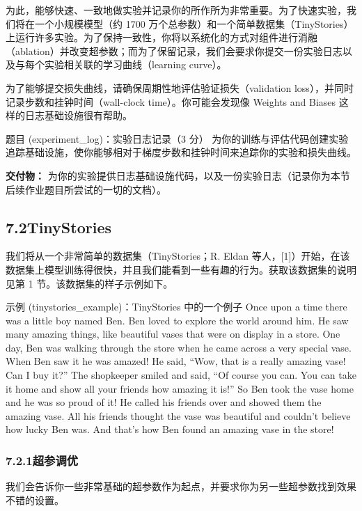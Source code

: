 为此，能够快速、一致地做实验并记录你的所作所为非常重要。为了快速实验，我们将在一个小规模模型（约 1700 万个总参数）和一个简单数据集（TinyStories）上运行许多实验。为了保持一致性，你将以系统化的方式对组件进行消融（ablation）并改变超参数；而为了保留记录，我们会要求你提交一份实验日志以及与每个实验相关联的学习曲线（learning curve）。

为了能够提交损失曲线，请确保周期性地评估验证损失（validation loss），并同时记录步数和挂钟时间（wall-clock time）。你可能会发现像 Weights and Biases 这样的日志基础设施很有帮助。

\begin{problembox}{题目 (experiment\_log)：实验日志记录（3 分）}
为你的训练与评估代码创建实验追踪基础设施，使你能够相对于梯度步数和挂钟时间来追踪你的实验和损失曲线。
\end{problembox}

\begin{deliverablebox}
\textbf{交付物：} 为你的实验提供日志基础设施代码，以及一份实验日志（记录你为本节后续作业题目所尝试的一切的文档）。
\end{deliverablebox}

\subsection*{7.2\quad TinyStories}
我们将从一个非常简单的数据集（TinyStories；R. Eldan 等人，[1]）开始，在该数据集上模型训练得很快，并且我们能看到一些有趣的行为。获取该数据集的说明见第 1 节。该数据集的样子示例如下。

\begin{problembox}{示例 (tinystories\_example)：TinyStories 中的一个例子}
Once upon a time there was a little boy named Ben. Ben loved to explore the world around him. He saw many amazing things, like beautiful vases that were on display in a store. One day, Ben was walking through the store when he came across a very special vase. When Ben saw it he was amazed! He said, ``Wow, that is a really amazing vase! Can I buy it?'' The shopkeeper smiled and said, ``Of course you can. You can take it home and show all your friends how amazing it is!'' So Ben took the vase home and he was so proud of it! He called his friends over and showed them the amazing vase. All his friends thought the vase was beautiful and couldn't believe how lucky Ben was. And that's how Ben found an amazing vase in the store!
\end{problembox}

\subsubsection*{7.2.1\quad 超参调优}
我们会告诉你一些非常基础的超参数作为起点，并要求你为另一些超参数找到效果不错的设置。

